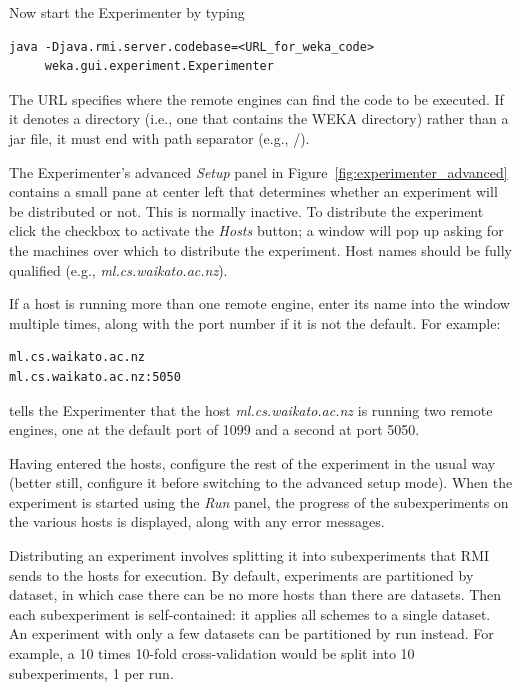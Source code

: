 Now start the Experimenter by typing

\begin{Verbatim}[fontsize=\footnotesize]
java -Djava.rmi.server.codebase=<URL_for_weka_code> 
     weka.gui.experiment.Experimenter
\end{Verbatim}

The URL specifies where the remote engines can find the code to be
executed. If it denotes a directory (i.e., one that contains the WEKA
directory) rather than a jar file, it must end with path separator
(e.g., /).

The Experimenter's advanced \textit{Setup} panel in
Figure~\ref{fig:experimenter_advanced} contains a small pane at center
left that determines whether an experiment will be distributed or
not. This is normally inactive. To distribute the experiment click the
checkbox to activate the \textit{Hosts} button; a window will pop up asking for
the machines over which to distribute the experiment. Host names
should be fully qualified (e.g., \textit{ml.cs.waikato.ac.nz}).

If a host is running more than one remote engine, enter its name into
the window multiple times, along with the port number if it is not the
default. For example:

\begin{Verbatim}
ml.cs.waikato.ac.nz
ml.cs.waikato.ac.nz:5050
\end{Verbatim}

\noindent tells the Experimenter that the host
\textit{ml.cs.waikato.ac.nz} is running two remote engines, one at the
default port of 1099 and a second at port 5050.

Having entered the hosts, configure the rest of the experiment in the
usual way (better still, configure it before switching to the advanced
setup mode). When the experiment is started using the \textit{Run}
panel, the progress of the subexperiments on the various hosts is
displayed, along with any error messages.

Distributing an experiment involves splitting it into subexperiments
that RMI sends to the hosts for execution. By default, experiments are
partitioned by dataset, in which case there can be no more hosts than
there are datasets. Then each subexperiment is self-contained: it
applies all schemes to a single dataset. An experiment with only a few
datasets can be partitioned by run instead. For example, a 10 times
10-fold cross-validation would be split into 10 subexperiments, 1 per
run.

